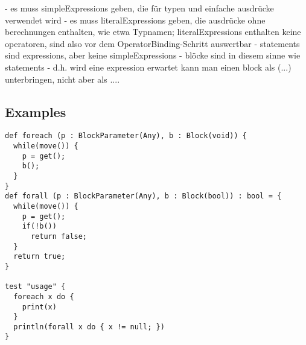 - es muss simpleExpressions geben, die für typen und einfache ausdrücke verwendet wird
- es muss literalExpressions geben, die ausdrücke ohne berechnungen enthalten, wie etwa Typnamen; literalExpressions enthalten keine operatoren, sind also vor dem OperatorBinding-Schritt auswertbar
- statements sind expressions, aber keine simpleExpressions
- blöcke sind in diesem sinne wie statements
- d.h. wird eine expression erwartet kann man einen block als ({...}) unterbringen, nicht aber als {...}.

\subsection{Examples}

\begin{lstlisting}[language=tyr]
def foreach (p : BlockParameter(Any), b : Block(void)) {
  while(move()) {
	p = get();
	b();
  }
}
def forall (p : BlockParameter(Any), b : Block(bool)) : bool = {
  while(move()) {
    p = get();
    if(!b())
      return false;
  }
  return true;
}

test "usage" {
  foreach x do {
    print(x)
  }
  println(forall x do { x != null; })
}
\end{lstlisting}
